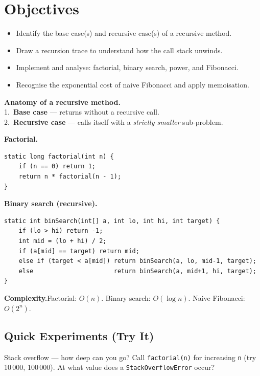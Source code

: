 \documentclass[11pt]{article}
\begin{document}
\labheader

\section*{Objectives}
\begin{itemize}[leftmargin=*,nosep]
  \item Identify the base case(s) and recursive case(s) of a recursive method.
  \item Draw a recursion trace to understand how the call stack unwinds.
  \item Implement and analyse: factorial, binary search, power, and Fibonacci.
  \item Recognise the exponential cost of naive Fibonacci and apply memoisation.
\end{itemize}

\begin{summary}
\textbf{Anatomy of a recursive method.}\\
1.~\textbf{Base case} --- returns without a recursive call.\\
2.~\textbf{Recursive case} --- calls itself with a \emph{strictly smaller} sub-problem.

\textbf{Factorial.}
\begin{lstlisting}
static long factorial(int n) {
    if (n == 0) return 1;
    return n * factorial(n - 1);
}
\end{lstlisting}

\textbf{Binary search (recursive).}
\begin{lstlisting}
static int binSearch(int[] a, int lo, int hi, int target) {
    if (lo > hi) return -1;
    int mid = (lo + hi) / 2;
    if (a[mid] == target) return mid;
    else if (target < a[mid]) return binSearch(a, lo, mid-1, target);
    else                      return binSearch(a, mid+1, hi, target);
}
\end{lstlisting}

\textbf{Complexity.}\quad Factorial: $O(n)$. Binary search: $O(\log n)$. Naive Fibonacci: $O(2^n)$.
\end{summary}

\subsection*{Quick Experiments (Try It)}

\begin{tryit}{Stack overflow --- how deep can you go?}
Call \texttt{factorial(n)} for increasing \texttt{n} (try 10\,000, 100\,000).
At what value does a \texttt{StackOverflowError} occur?
\end{tryit}
\end{document}
